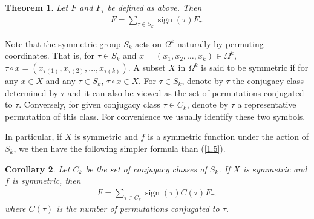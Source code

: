 \documentclass[reqno]{amsart}
\newtheorem{thm}{Theorem}[section]
\newtheorem{prop}[thm]{Corollary}
\newtheorem{defn}[thm]{Definition}
\theoremstyle{remark}
\numberwithin{equation}{section}
\DeclareMathOperator{\sign}{sign}
\begin{document}
\begin{thm} \label{thm1.0}Let $F$ and $F_{\tau}$ be defined as above. Then   \begin{align}
  \label{1.5} F=\sum_{\tau\in S_k}{\sign(\tau)F_{\tau}}.
    \end{align}
 \end{thm}




Note that the symmetric group $S_k$ acts on $\Omega^k$ naturally by
permuting coordinates. That is, for $\tau\in S_k$ and
$x=(x_1,x_2,\dots,x_k)\in \Omega^k$,  $\tau\circ
x=(x_{\tau(1)},x_{\tau(2)},\dots,x_{\tau(k)}).$
  A subset $X$ in $\Omega^k$ is said to be symmetric if for any $x\in X$ and
any $\tau\in S_k$, $\tau\circ x \in X $.
%
%
%
 For $\tau\in S_k$, denote by $\overline{\tau}$
 the conjugacy class determined by $\tau$ and it can
also be viewed as the set of permutations conjugated to $\tau$.
Conversely, for given conjugacy class $\overline{\tau}\in C_k$,
denote by $\tau$ a representative permutation of this class. For
convenience we usually identify these two symbols.

In particular,  if  $X$ is symmetric and $f$ is a symmetric function
under the action of $S_k$,  we then have the following simpler
formula than (\ref{1.5}).
\begin{prop} \label{thm1.1} Let $C_k$ be the set of conjugacy  classes
 of $S_k$.  If $X$ is symmetric and $f$ is symmetric, then
 \begin{align}\label{7} F=\sum_{\tau \in C_k}\sign(\tau) C(\tau)F_{\tau},
  \end{align} where $C(\tau)$ is the number of permutations conjugated to
  $\tau$.
\end{prop}
\end{document}
